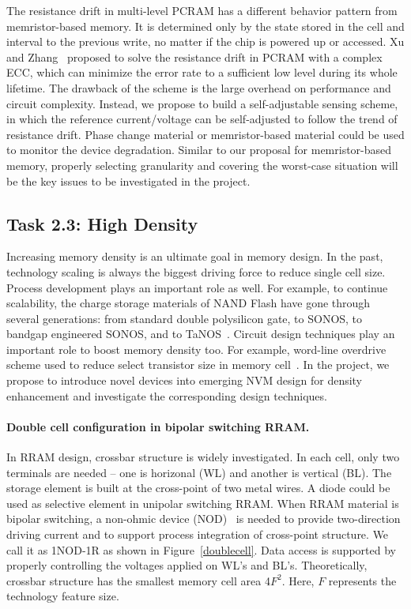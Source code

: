 The resistance drift in multi-level PCRAM has a different behavior pattern from memristor-based memory. It is determined only by the state stored in the cell and interval to the previous write, no matter if the chip is powered up or accessed. Xu and Zhang~\cite{Xu10} proposed to solve the resistance drift in PCRAM with a complex ECC, which can minimize the error rate to a sufficient low level during its whole lifetime. The drawback of the scheme is the large overhead on performance and circuit complexity. Instead, we propose to build a self-adjustable sensing scheme, in which the reference current/voltage can be self-adjusted to follow the trend of resistance drift. Phase change material or memristor-based material could be used to monitor the device degradation. Similar to our proposal for memristor-based memory, properly selecting granularity and covering the worst-case situation will be the key issues to be investigated in the project.

\subsection{Task 2.3: High Density}
Increasing memory density is an ultimate goal in memory design. In the past, technology scaling is always the biggest driving force to reduce single cell size. Process development plays an important role as well. For example, to continue scalability, the charge storage materials of NAND Flash have gone through several generations: from standard double polysilicon gate, to SONOS, to bandgap engineered SONOS, and to TaNOS~\cite{Lu09}. Circuit design techniques play an important role to boost memory density too. For example, word-line overdrive scheme used to reduce select transistor size in memory cell~\cite{Li09}. In the project, we propose to introduce novel devices into emerging NVM design for density enhancement and investigate the corresponding design techniques.

\paragraph{Double cell configuration in bipolar switching RRAM.}
In RRAM design, crossbar structure is widely investigated. In each cell, only two terminals are needed -- one is horizonal (WL) and another is vertical (BL). The storage element is built at the cross-point of two metal wires. A diode could be used as selective element in unipolar switching RRAM. When RRAM material is bipolar switching, a non-ohmic device (NOD)~\cite{Yan4430255} is needed to provide two-direction driving current and to support process integration of cross-point structure. We call it as 1NOD-1R as shown in Figure~\ref{doublecell}. Data access is supported by properly controlling the voltages applied on WL's and BL's. Theoretically, crossbar structure has the smallest memory cell area 4$F^2$. Here, $F$ represents the technology feature size.


